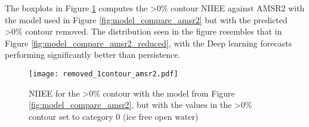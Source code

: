 \documentclass[../main/thesis.tex]{subfiles}
\begin{document}
The boxplots in Figure \ref{fig:removed_1contour_amsr2} computes the >0\% contour NIIEE against AMSR2 with the model used in Figure \ref{fig:model_compare_amsr2} but with the predicted >0\% contour removed. The distribution seen in the figure resembles that in Figure \ref{fig:model_compare_amsr2_reduced}, with the Deep learning forecasts performing significantly better than persistence. 

\begin{figure}
    \centering
    \texttt{[image: removed\_1contour\_amsr2.pdf]}
    \caption{\label{fig:removed_1contour_amsr2}NIIEE for the >0\% contour with the model from Figure \ref{fig:model_compare_amsr2}, but with the values in the >0\% contour set to category 0 (ice free open water)}
\end{figure}


\biblio
\end{document}
